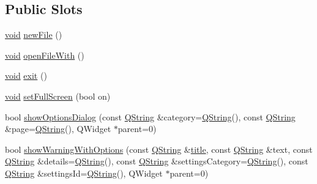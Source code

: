 \subsection*{Public Slots}
\begin{DoxyCompactItemize}
\item 
\hyperlink{group___u_a_v_objects_plugin_ga444cf2ff3f0ecbe028adce838d373f5c}{void} \hyperlink{group___core_plugin_ga69f73b93cc05c89a9ae1be0161105982}{new\-File} ()
\item 
\hyperlink{group___u_a_v_objects_plugin_ga444cf2ff3f0ecbe028adce838d373f5c}{void} \hyperlink{group___core_plugin_ga6b2e95592588842489c28905b25548c4}{open\-File\-With} ()
\item 
\hyperlink{group___u_a_v_objects_plugin_ga444cf2ff3f0ecbe028adce838d373f5c}{void} \hyperlink{group___core_plugin_ga627d7b538a0d60645e6c339bd787eeee}{exit} ()
\item 
\hyperlink{group___u_a_v_objects_plugin_ga444cf2ff3f0ecbe028adce838d373f5c}{void} \hyperlink{group___core_plugin_gac3795529e7fd028195be00ec0187e6d5}{set\-Full\-Screen} (bool on)
\item 
bool \hyperlink{group___core_plugin_ga18a22906e317f7beddef59f9557a80ee}{show\-Options\-Dialog} (const \hyperlink{group___u_a_v_objects_plugin_gab9d252f49c333c94a72f97ce3105a32d}{Q\-String} \&category=\hyperlink{group___u_a_v_objects_plugin_gab9d252f49c333c94a72f97ce3105a32d}{Q\-String}(), const \hyperlink{group___u_a_v_objects_plugin_gab9d252f49c333c94a72f97ce3105a32d}{Q\-String} \&page=\hyperlink{group___u_a_v_objects_plugin_gab9d252f49c333c94a72f97ce3105a32d}{Q\-String}(), Q\-Widget $\ast$parent=0)
\item 
bool \hyperlink{group___core_plugin_gaf0d1f8838353576747cfa4b184a6b2f4}{show\-Warning\-With\-Options} (const \hyperlink{group___u_a_v_objects_plugin_gab9d252f49c333c94a72f97ce3105a32d}{Q\-String} \&\hyperlink{_parse_e_k_f_log_8m_a5df555a5fed35967e041e4abd1269b4e}{title}, const \hyperlink{group___u_a_v_objects_plugin_gab9d252f49c333c94a72f97ce3105a32d}{Q\-String} \&text, const \hyperlink{group___u_a_v_objects_plugin_gab9d252f49c333c94a72f97ce3105a32d}{Q\-String} \&details=\hyperlink{group___u_a_v_objects_plugin_gab9d252f49c333c94a72f97ce3105a32d}{Q\-String}(), const \hyperlink{group___u_a_v_objects_plugin_gab9d252f49c333c94a72f97ce3105a32d}{Q\-String} \&settings\-Category=\hyperlink{group___u_a_v_objects_plugin_gab9d252f49c333c94a72f97ce3105a32d}{Q\-String}(), const \hyperlink{group___u_a_v_objects_plugin_gab9d252f49c333c94a72f97ce3105a32d}{Q\-String} \&settings\-Id=\hyperlink{group___u_a_v_objects_plugin_gab9d252f49c333c94a72f97ce3105a32d}{Q\-String}(), Q\-Widget $\ast$parent=0)
\end{DoxyCompactItemize}
